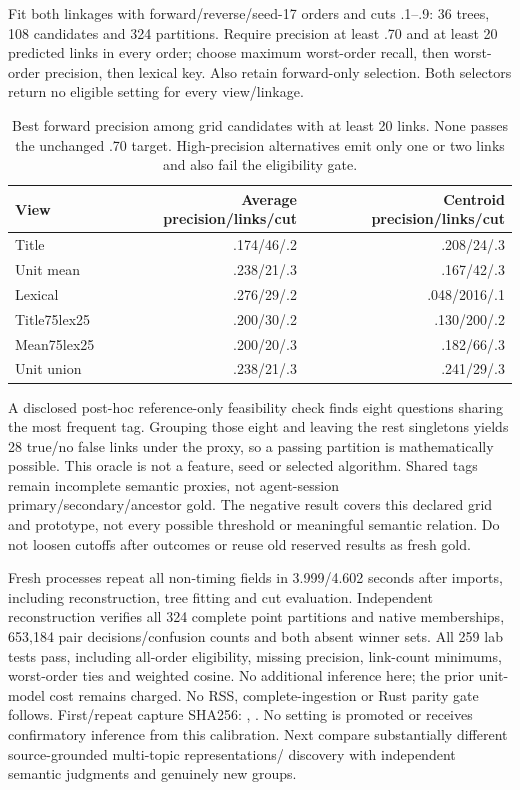 \documentclass[11pt]{article}
\begin{document}
Fit both linkages with forward/reverse/seed-17 orders and cuts .1--.9: 36 trees,
108 candidates and 324 partitions. Require precision at least .70 and at least
20 predicted links in every order; choose maximum worst-order recall, then
worst-order precision, then lexical key. Also retain forward-only selection.
Both selectors return no eligible setting for every view/linkage.

\begin{table}[ht]
\centering\small
\begin{tabular}{lrr}
\toprule
View & Average precision/links/cut & Centroid precision/links/cut\\
\midrule
Title & .174/46/.2 & .208/24/.3\\
Unit mean & .238/21/.3 & .167/42/.3\\
Lexical & .276/29/.2 & .048/2016/.1\\
Title75lex25 & .200/30/.2 & .130/200/.2\\
Mean75lex25 & .200/20/.3 & .182/66/.3\\
Unit union & .238/21/.3 & .241/29/.3\\
\bottomrule
\end{tabular}
\caption{Best forward precision among grid candidates with at least 20 links.
None passes the unchanged .70 target. High-precision alternatives emit only
one or two links and also fail the eligibility gate.}
\end{table}

A disclosed post-hoc reference-only feasibility check finds eight questions
sharing the most frequent tag. Grouping those eight and leaving the rest
singletons yields 28 true/no false links under the proxy, so a passing partition
is mathematically possible. This oracle is not a feature, seed or selected
algorithm. Shared tags remain incomplete semantic proxies, not agent-session
primary/secondary/ancestor gold. The negative result covers this declared grid
and prototype, not every possible threshold or meaningful semantic relation.
Do not loosen cutoffs after outcomes or reuse old reserved results as fresh gold.

Fresh processes repeat all non-timing fields in 3.999/4.602 seconds after imports,
including reconstruction, tree fitting and cut evaluation. Independent
reconstruction verifies all 324 complete point partitions and native memberships,
653,184 pair decisions/confusion counts and both absent winner sets. All 259
lab tests pass, including all-order eligibility, missing precision, link-count
minimums, worst-order ties and weighted cosine. No additional inference here;
the prior unit-model cost remains charged. No RSS, complete-ingestion or Rust
parity gate follows. First/repeat capture SHA256:
,
.
No setting is promoted or receives confirmatory inference from this calibration.
Next compare substantially different source-grounded multi-topic representations/
discovery with independent semantic judgments and genuinely new groups.
\end{document}
